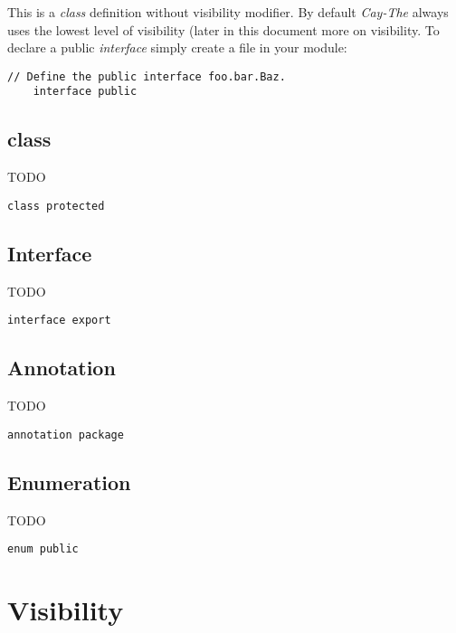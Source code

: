 \documentclass[11pt,a4paper]{report}
\begin{document}
This is a \textit{class} definition without visibility modifier. By default \textit{Cay-The} always uses the lowest level of visibility (later in this document more on visibility. To declare a public \textit{interface} simply create a file in your module:

\begin{lstlisting}[language=CayThe, title=foo/bar/Baz.ct]
    // Define the public interface foo.bar.Baz.
    interface public
\end{lstlisting}

\subsection{class}

TODO

\begin{lstlisting}[language=CayThe, title=foo/bar/Baz.ct]
    class protected
\end{lstlisting}

\subsection{Interface}

TODO

\begin{lstlisting}[language=CayThe, title=foo/bar/Baz.ct]
    interface export    
\end{lstlisting}


\subsection{Annotation}

TODO

\begin{lstlisting}[language=CayThe, title=foo/bar/Baz.ct]
    annotation package
\end{lstlisting}

\subsection{Enumeration}

TODO

\begin{lstlisting}[language=CayThe, title=foo/bar/Baz.ct]
    enum public    
\end{lstlisting}

\section{Visibility}
\end{document}

